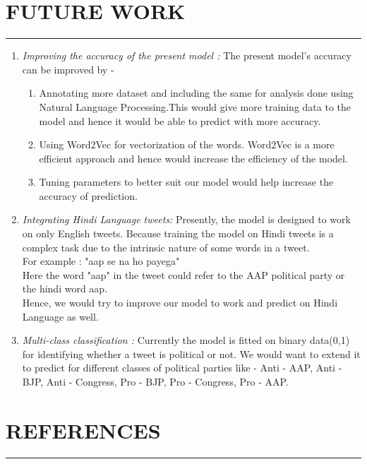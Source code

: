 \documentclass[a4paper,11pt]{article}
\begin{document}
\section{FUTURE WORK}
\hrule
\vspace*{5mm}
\begin{enumerate}
    \item \textit{Improving the accuracy of the present model :} The present model's accuracy can be improved by - 
    \begin{enumerate}
        \item Annotating more dataset and including the same for analysis done using Natural Language Processing.This would give more training data to the model and hence it would be able to predict with more accuracy.
        \item Using Word2Vec for vectorization of the words. Word2Vec is a more efficient approach and hence would increase the efficiency of the model.
        \item Tuning parameters to better suit our model would help increase the accuracy of prediction.
    \end{enumerate}
    \vspace*{5mm}
    \item \textit{Integrating Hindi Language tweets:} Presently, the model is designed to work on only English tweets. Because training the model on Hindi tweets is a complex task due to the intrinsic nature of some words in a tweet.\\
    For example : "aap se na ho payega"\\
    Here the word "aap" in the tweet could refer to the AAP political party or the hindi word aap.\\
    Hence, we would try to improve our model to work and predict on Hindi Language as well.
    
    
    \vspace*{5mm}
    \item \textit{Multi-class classification :} Currently the model is fitted on binary data(0,1) for identifying whether a tweet is political or not. We would want to extend it to predict for different classes of political parties like - Anti - AAP, Anti - BJP, Anti - Congress, Pro - BJP, Pro - Congress, Pro - AAP.
    
\end{enumerate}


\newpage
\section{REFERENCES}
\hrule
\vspace*{5mm}


 

\end{document}
